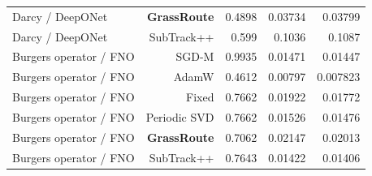 \begin{table}[t]
{\begin{tabular}{lrrrr}
\rowcolor{oursbg}Darcy / DeepONet  & \textbf{GrassRoute} &  0.4898  &  0.03734  &  0.03799\\
Darcy / DeepONet  &  SubTrack++  &  0.599  &  0.1036  &  0.1087\\
Burgers operator / FNO  &  SGD-M  &  0.9935  &  0.01471  &  0.01447\\
Burgers operator / FNO  &  AdamW  &  0.4612  &  0.00797  &  0.007823\\
Burgers operator / FNO  &  Fixed  &  0.7662  &  0.01922  &  0.01772\\
Burgers operator / FNO  &  Periodic SVD  &  0.7662  &  0.01526  &  0.01476\\
\rowcolor{oursbg}Burgers operator / FNO  & \textbf{GrassRoute} &  0.7062  &  0.02147  &  0.02013\\
Burgers operator / FNO  &  SubTrack++  &  0.7643  &  0.01422  &  0.01406\\
\bottomrule\end{tabular}}
\end{table}
